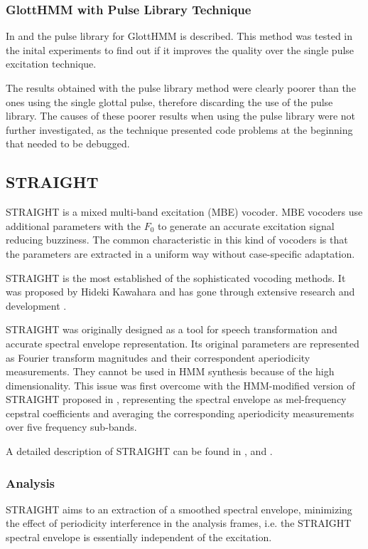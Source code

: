 \subsubsection{GlottHMM with Pulse Library Technique}
\label{vocoders_glott_pulse_library}
In \cite{TuomoMSc} and \cite{manuMSc} the pulse library for GlottHMM is described.
%
This method was tested in the inital experiments to find out if it improves the quality over the single pulse excitation technique.

The results obtained with the pulse library method were clearly poorer than the ones using the single glottal pulse, therefore discarding the use of the pulse library.
%
The causes of these poorer results when using the pulse library were not further investigated, as the technique presented code problems at the beginning that needed to be debugged.

\subsection{STRAIGHT}
\label{vocoders_straight}
STRAIGHT is a mixed multi-band excitation (MBE) vocoder.
%
MBE vocoders use additional parameters with the $F_{0}$ to generate an accurate excitation signal reducing buzziness.
%
The common characteristic in this kind of vocoders is that the parameters are extracted in a uniform way without case-specific adaptation.

STRAIGHT is the most established of the sophisticated vocoding methods.
%
It was proposed by Hideki Kawahara \cite{kawahara1997speech} and has gone through extensive research and development \cite{kawahara1999restructuring}.

STRAIGHT was originally designed as a tool for speech transformation and accurate spectral envelope representation.
%
Its original parameters are represented as Fourier transform magnitudes and their correspondent aperiodicity measurements.
%
They cannot be used in HMM synthesis because of the high dimensionality. 
%
This issue was first overcome with the HMM-modified version of STRAIGHT proposed in \cite{heiga2007details}, representing the spectral envelope as mel-frequency cepstral coefficients and averaging the corresponding aperiodicity measurements over five frequency sub-bands.


A detailed description of STRAIGHT can be found in \cite{kawahara1997speech}, \cite{heiga2007details} and \cite{manuMSc}.

\subsubsection{Analysis}
\label{vocoders_straight_analysis}
STRAIGHT aims to an extraction of a smoothed spectral envelope, minimizing the effect of periodicity interference in the analysis frames, i.e. the STRAIGHT spectral envelope is essentially independent of the excitation.


